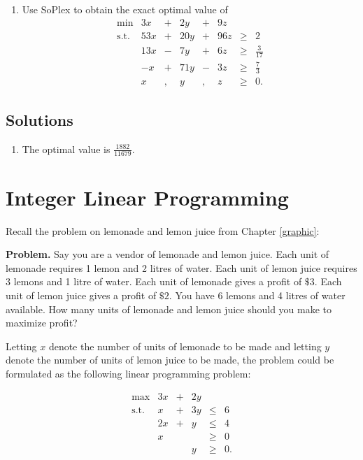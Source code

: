 \documentclass[]{book}
\providecommand{\tightlist}{%
  \setlength{\itemsep}{0pt}\setlength{\parskip}{0pt}}
\theoremstyle{definition}
\theoremstyle{definition}
\theoremstyle{remark}
\begin{document}
\begin{enumerate}
\def\labelenumi{\arabic{enumi}.}
\tightlist
\item
  Use SoPlex to obtain the exact optimal value of
  \[\begin{array}{rrcrcrcl}
  \min & 3 x & + & 2 y & + & 9 z \\
  \text{s.t.} & 53 x & + & 20 y & + & 96 z & \geq & 2 \\
   & 13 x & - & 7 y & + & 6 z & \geq & \frac{3}{17} \\
   & -x & + & 71 y & - & 3 z & \geq & \frac{7}{3} \\
   & x &, & y &,  &z  &\geq & 0.
  \end{array}\]
\end{enumerate}

\section*{Solutions}\label{solutions-9}

\begin{enumerate}
\def\labelenumi{\arabic{enumi}.}
\tightlist
\item
  The optimal value is \(\frac{1882}{11679}\).
\end{enumerate}

\chapter{Integer Linear Programming}\label{integer-linear-programming}

Recall the problem on lemonade and lemon juice from Chapter
\ref{graphic}:

\textbf{Problem.} Say you are a vendor of lemonade and lemon juice. Each
unit of lemonade requires 1 lemon and 2 litres of water. Each unit of
lemon juice requires 3 lemons and 1 litre of water. Each unit of
lemonade gives a profit of \(\$ 3\). Each unit of lemon juice gives a
profit of \(\$ 2\). You have 6 lemons and 4 litres of water available.
How many units of lemonade and lemon juice should you make to maximize
profit?

Letting \(x\) denote the number of units of lemonade to be made and
letting \(y\) denote the number of units of lemon juice to be made, the
problem could be formulated as the following linear programming problem:

\[\begin{array}{rrcrll}
\max & 3x & + & 2y & \\
\text{s.t.} 
& x & + & 3y & \leq & 6 \\
& 2x & +&  y & \leq & 4 \\
& x &  & & \geq & 0 \\
& & & y & \geq & 0. \\
\end{array}\]
\end{document}
